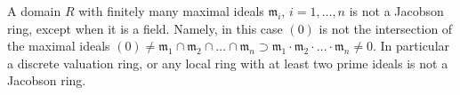 \begin{example}
\label{example-not-jacobson}
A domain $R$ with finitely many maximal ideals
$\mathfrak m_i$, $i = 1, \ldots, n$ is not a
Jacobson ring, except when it is a field.
Namely, in this case $(0)$ is not the intersection
of the maximal ideals $(0) \not =
\mathfrak m_1 \cap \mathfrak m_2 \cap \ldots \cap \mathfrak m_n
\supset \mathfrak m_1 \cdot \mathfrak m_2 \cdot \ldots
\cdot \mathfrak m_n \not = 0$.
In particular a discrete valuation ring, or any local ring with
at least two prime ideals is not a Jacobson
ring.
\end{example}